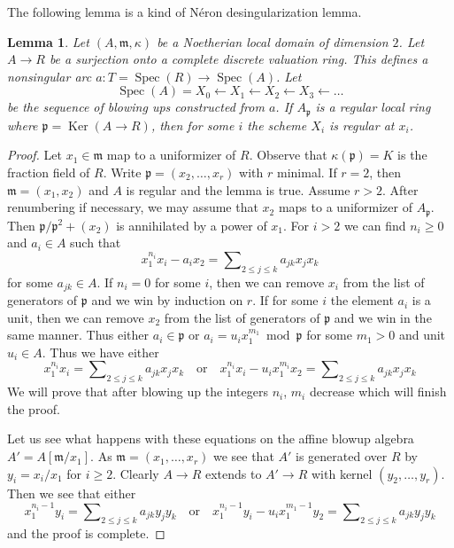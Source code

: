 \documentclass{stacks-project}
\theoremstyle{plain}
\newtheorem{lemma}[subsection]{Lemma}
\theoremstyle{definition}
\theoremstyle{remark}
\numberwithin{equation}{subsection}
\def\Spec{\mathop{\mathrm{Spec}}}
\def\Ker{\mathop{\mathrm{Ker}}}
\begin{document}
\noindent
The following lemma is a kind of N\'eron desingularization lemma.

\begin{lemma}
\label{lemma-sequence-blowups-along-arc-becomes-nonsingular}
Let $(A, \mathfrak m, \kappa)$ be a Noetherian local domain of
dimension $2$. Let $A \to R$ be a surjection onto a
complete discrete valuation ring.
This defines a nonsingular arc $a : T = \Spec(R) \to \Spec(A)$. Let
$$
\Spec(A) = X_0 \leftarrow X_1 \leftarrow X_2 \leftarrow X_3 \leftarrow \ldots
$$
be the sequence of blowing ups constructed from $a$.
If $A_\mathfrak p$ is a regular local ring where
$\mathfrak p = \Ker(A \to R)$, then
for some $i$ the scheme $X_i$ is regular at $x_i$.
\end{lemma}

\begin{proof}
Let $x_1 \in \mathfrak m$ map to a uniformizer of $R$.
Observe that $\kappa(\mathfrak p) = K$ is the
fraction field of $R$. Write $\mathfrak p = (x_2, \ldots, x_r)$
with $r$ minimal. If $r = 2$, then $\mathfrak m = (x_1, x_2)$
and $A$ is regular and the lemma is true. Assume $r > 2$.
After renumbering if necessary,
we may assume that $x_2$ maps to a uniformizer of $A_\mathfrak p$.
Then $\mathfrak p/\mathfrak p^2 + (x_2)$ is annihilated by a power
of $x_1$. For $i > 2$ we can find $n_i \geq 0$ and $a_i \in A$
such that
$$
x_1^{n_i} x_i - a_i x_2 = \sum\nolimits_{2 \leq j \leq k} a_{jk} x_jx_k
$$
for some $a_{jk} \in A$. If $n_i = 0$ for some $i$, then we can remove
$x_i$ from the list of generators of $\mathfrak p$ and we win by
induction on $r$. If for some $i$ the element $a_i$ is a unit, then
we can remove $x_2$ from the list of generators of $\mathfrak p$
and we win in the same manner. Thus either
$a_i \in \mathfrak p$ or $a_i = u_i x_1^{m_1} \bmod \mathfrak p$
for some $m_1 > 0$ and unit $u_i \in A$. Thus we have either
$$
x_1^{n_i} x_i = \sum\nolimits_{2 \leq j \leq k} a_{jk} x_jx_k
\quad\text{or}\quad
x_1^{n_i} x_i - u_i x_1^{m_i} x_2 =
\sum\nolimits_{2 \leq j \leq k} a_{jk} x_jx_k
$$
We will prove that after blowing up the integers $n_i$, $m_i$
decrease which will finish the proof.

\medskip\noindent
Let us see what happens with these equations on the affine blowup
algebra $A' = A[\mathfrak m/x_1]$. As $\mathfrak m = (x_1, \ldots, x_r)$
we see that $A'$ is generated over $R$ by $y_i = x_i/x_1$ for $i \geq 2$.
Clearly $A \to R$ extends to $A' \to R$ with kernel
$(y_2, \ldots, y_r)$. Then we see that either
$$
x_1^{n_i - 1} y_i = \sum\nolimits_{2 \leq j \leq k} a_{jk} y_jy_k
\quad\text{or}\quad
x_1^{n_i - 1} y_i - u_i x_1^{m_1 - 1} y_2 =
\sum\nolimits_{2 \leq j \leq k} a_{jk} y_jy_k
$$
and the proof is complete.
\end{proof}
\end{document}
